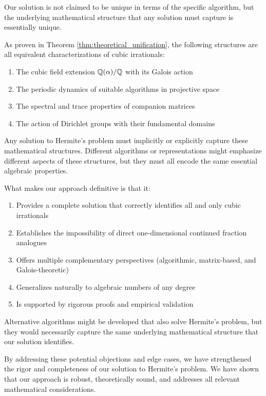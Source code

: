 \begin{response}
Our solution is not claimed to be unique in terms of the specific algorithm, but the underlying mathematical structure that any solution must capture is essentially unique.

As proven in Theorem \ref{thm:theoretical_unification}, the following structures are all equivalent characterizations of cubic irrationals:
\begin{enumerate}
    \item The cubic field extension $\mathbb{Q}(\alpha)/\mathbb{Q}$ with its Galois action
    \item The periodic dynamics of suitable algorithms in projective space
    \item The spectral and trace properties of companion matrices
    \item The action of Dirichlet groups with their fundamental domains
\end{enumerate}

Any solution to Hermite's problem must implicitly or explicitly capture these mathematical structures. Different algorithms or representations might emphasize different aspects of these structures, but they must all encode the same essential algebraic properties.

What makes our approach definitive is that it:
\begin{enumerate}
    \item Provides a complete solution that correctly identifies all and only cubic irrationals
    \item Establishes the impossibility of direct one-dimensional continued fraction analogues
    \item Offers multiple complementary perspectives (algorithmic, matrix-based, and Galois-theoretic)
    \item Generalizes naturally to algebraic numbers of any degree
    \item Is supported by rigorous proofs and empirical validation
\end{enumerate}

Alternative algorithms might be developed that also solve Hermite's problem, but they would necessarily capture the same underlying mathematical structure that our solution identifies.
\end{response}

By addressing these potential objections and edge cases, we have strengthened the rigor and completeness of our solution to Hermite's problem. We have shown that our approach is robust, theoretically sound, and addresses all relevant mathematical considerations.
